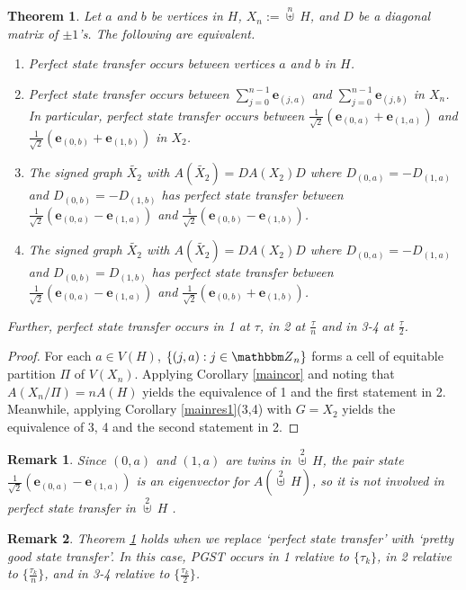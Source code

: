 \documentclass[12pt,a4paper]{article}
\newtheorem{thm}{Theorem}
\newtheorem{rem}{Remark}
\def \Zl {{\mathbbm Z}}
\def \e {{\bf e}}
\def \e {{\mathbf e}}
\newcommand{\cb}[1]{\left\lbrace #1\right\rbrace}
\begin{document}
\begin{thm}
\label{corbu}
Let $a$ and $b$ be vertices in $H$, $X_n:=\overset{n}{\uplus}~H$, and $D$ be a diagonal matrix of $\pm 1$'s. The following are equivalent.
\begin{enumerate}
\item Perfect state transfer occurs between vertices $a$ and $b$ in $H$.
\item Perfect state transfer occurs between $\sum_{j=0}^{n-1}\e_{(j,a)}$ and $\sum_{j=0}^{n-1}\e_{(j,b)}$ in $X_n$. In particular, perfect state transfer occurs between $\frac{1}{\sqrt2}(\e_{(0,a)}+\e_{(1,a)})$ and $\frac{1}{\sqrt2}(\e_{(0,b)}+\e_{(1,b)})$ in $X_2$.
\item The signed graph $\tilde{X_2}$ with $A(\tilde{X_2})=DA(X_2)D$ where $D_{(0,a)}=-D_{(1,a)}$ and $D_{(0,b)}=-D_{(1,b)}$ has perfect state transfer between $\frac{1}{\sqrt2}(\e_{(0,a)}-\e_{(1,a)})$ and $\frac{1}{\sqrt2}(\e_{(0,b)}-\e_{(1,b)})$.
\item The signed graph $\tilde{X_2}$ with $A(\tilde{X_2})=DA(X_2)D$ where $D_{(0,a)}=-D_{(1,a)}$ and $D_{(0,b)}=D_{(1,b)}$ has perfect state transfer between $\frac{1}{\sqrt2}(\e_{(0,a)}-\e_{(1,a)})$ and $\frac{1}{\sqrt2}(\e_{(0,b)}+\e_{(1,b)})$.
\end{enumerate}
Further, perfect state transfer occurs in 1 at $\tau$, in 2 at $\frac{\tau}{n}$ and in 3-4 at $\frac{\tau}{2}$.
\end{thm}

\begin{proof}
For each $a\in V(H)$, $\cb{(j,a):j\in\Zl_n}$ forms a cell of equitable partition $\Pi$ of $V(X_n)$. Applying Corollary \ref{maincor} and noting that $A(X_n/\Pi)=nA(H)$ yields the equivalence of 1 and the first statement in 2. Meanwhile, applying Corollary \ref{mainres1}(3,4) with $G=X_2$ yields the equivalence of 3, 4 and the second statement in 2.
\end{proof}

\begin{rem}
Since $(0,a)$ and $(1,a)$ are twins in $\overset{2}{\uplus}~H$, the pair state $\frac{1}{\sqrt2}(\e_{(0,a)}-\e_{(1,a)})$ is an eigenvector for $A(\overset{2}{\uplus}~H)$, so it is not involved in perfect state transfer in $\overset{2}{\uplus}~H$ \cite{mon2}.
\end{rem}

\begin{rem}
\label{pgstbu}
Theorem \ref{corbu} holds when we replace `perfect state transfer' with `pretty good state transfer'. In this case, PGST occurs in 1 relative to $\{\tau_k\}$, in 2 relative to $\{\frac{\tau_k}{n}\}$, and in 3-4 relative to $\{\frac{\tau_k}{2}\}$.
\end{rem}
\end{document}
